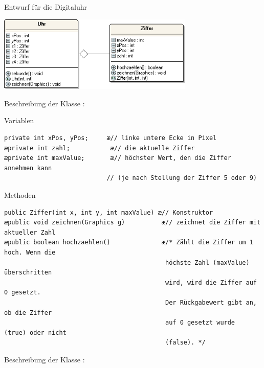 Entwurf für die Digitaluhr

\begin{minipage}{1.0\textwidth}
\begin{center}
\includegraphics[width=0.7\textwidth]{./inf/SEKII/12_Java_Datenkapselung/digitaluhrUML.png}
\end{center}
\end{minipage}

\vspace{10mm}

Beschreibung der Klasse :

\begin{compactenum}[a)]
\item Variablen

\begin{lstlisting}
private int xPos, yPos;     æ// linke untere Ecke in Pixel
æprivate int zahl;           æ// die aktuelle Ziffer
æprivate int maxValue;       æ// höchster Wert, den die Ziffer annehmen kann
                            // (je nach Stellung der Ziffer 5 oder 9)
\end{lstlisting}

\item Methoden

\begin{lstlisting}
public Ziffer(int x, int y, int maxValue) æ// Konstruktor
æpublic void zeichnen(Graphics g)          æ// zeichnet die Ziffer mit aktueller Zahl
æpublic boolean hochzaehlen()              æ/* Zählt die Ziffer um 1 hoch. Wenn die                                            
                                            höchste Zahl (maxValue) überschritten
                                            wird, wird die Ziffer auf 0 gesetzt.
                                            Der Rückgabewert gibt an, ob die Ziffer
                                            auf 0 gesetzt wurde  (true) oder nicht 
                                            (false). */
\end{lstlisting}
\end{compactenum}

Beschreibung der Klasse :


